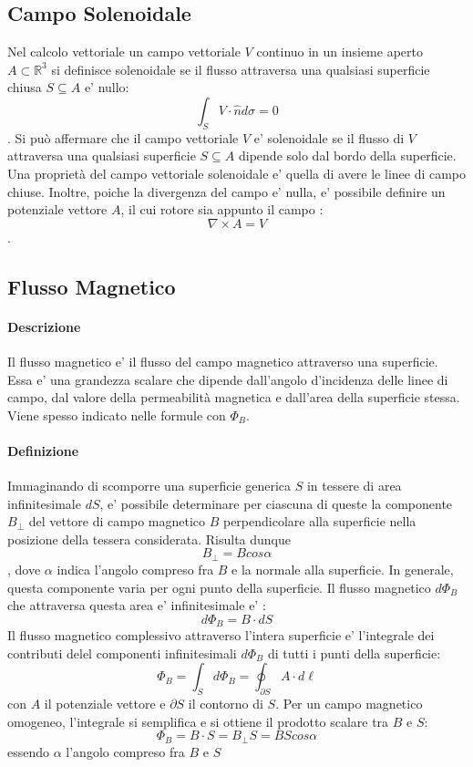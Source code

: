 \documentclass[a4paper, 10pt]{article}
\begin{document}
		\subsection{Campo Solenoidale}
			Nel calcolo vettoriale un campo vettoriale $V$ continuo in un insieme aperto $A \subset \mathbb{R}^3$ si definisce 
			solenoidale se il flusso attraversa una qualsiasi superficie chiusa $S \subseteq A$ e' nullo:
			\[ \int_S V \cdot \widehat{n} d\sigma =0 \]. Si può affermare che il campo vettoriale $V$ e' solenoidale se 
			il flusso di $V$ attraversa una qualsiasi superficie $S \subseteq A$ dipende solo dal bordo della superficie.
			Una proprietà del campo vettoriale solenoidale e' quella di avere le linee di campo chiuse. Inoltre, poiche 
			la divergenza del campo e' nulla, e' possibile definire un potenziale vettore $A$, il cui rotore sia appunto
			il campo :
			\[ \nabla \times A = V \]. 
		\subsection{Flusso Magnetico}
			\paragraph*{Descrizione} Il flusso magnetico e' il flusso del campo magnetico attraverso una superficie. Essa e' 
			una grandezza scalare che dipende dall'angolo d'incidenza delle linee di campo, dal valore della permeabilità
			magnetica e dall'area della superficie stessa. Viene spesso indicato nelle formule con $\Phi_B$.
			\paragraph*{Definizione}
			Immaginando di scomporre una superficie generica $S$ in tessere di area infinitesimale $dS$, e' possibile determinare 
			per ciascuna di queste la componente $B_\bot$ del vettore di campo magnetico $B$ perpendicolare alla superficie 
			nella posizione della tessera considerata. Risulta dunque \[ B_\bot = B cos \alpha \], dove $\alpha$ indica l'angolo
			compreso fra $B$ e la normale alla superficie. In generale, questa componente varia per ogni punto della 
			superficie. Il flusso magnetico $d \Phi_B$ che attraversa questa area e' infinitesimale e' : \[ d \Phi_B = B \cdot dS \]
			Il flusso magnetico complessivo attraverso l'intera superficie e' l'integrale dei contributi delel componenti
			infinitesimali $d\Phi_B$ di tutti i punti della superficie:
			\[ \Phi_B = \int_S d\Phi_B = \oint_{\partial S} A \cdot d\ell \] con $A$ il potenziale vettore e $\partial S$
			il contorno di $S$. Per un campo magnetico omogeneo, l'integrale si semplifica e si ottiene il prodotto scalare tra 
			$B$ e $S$:
			\[ \Phi_B = B \cdot S = B_\bot S = BS cos \alpha \]
			essendo $\alpha$ l'angolo compreso fra $B$ e $S$    
	\newpage
\end{document}
